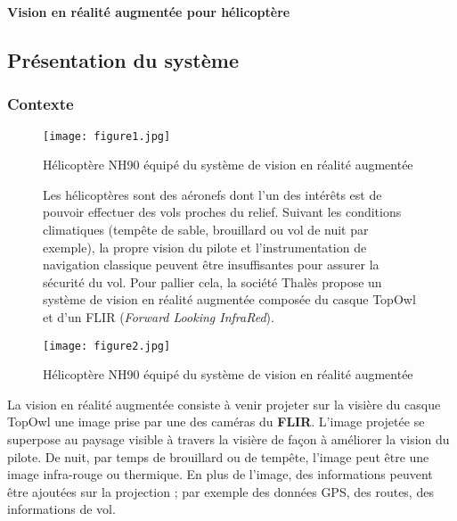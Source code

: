 \begin{huge}
\textbf{Vision en réalité augmentée pour hélicoptère}
\end{huge}

\subsection{Présentation du système}

\subsubsection{Contexte}
\begin{figure}[h]
\begin{center}
\texttt{[image: figure1.jpg]}
\caption{Hélicoptère NH90 équipé du système de vision en réalité augmentée\label{fig1}}
\end{center}
\end{figure}

\begin{figure}[!htb]
\begin{center}
\begin{minipage}{0.45\textwidth}
Les hélicoptères sont des aéronefs dont l'un des intérêts
est de pouvoir effectuer des vols proches du relief. Suivant
les conditions climatiques (tempête de sable, brouillard
ou vol de nuit par exemple), la propre vision du pilote
et l'instrumentation de navigation classique peuvent être
insuffisantes pour assurer la sécurité du vol. Pour pallier
cela, la société Thalès propose un système de vision en
réalité augmentée composée du casque TopOwl et d'un
FLIR (\textit{Forward Looking InfraRed}).
\end{minipage}
\begin{minipage}{0.45\textwidth}
\begin{center}
\texttt{[image: figure2.jpg]}
\caption{Hélicoptère NH90 équipé du système de vision en réalité augmentée\label{fig2}}
\end{center}
\end{minipage}
\end{center}
\end{figure}

La vision en réalité augmentée consiste à venir projeter
sur la visière du casque TopOwl une image prise par une
des caméras du \textbf{FLIR}. L'image projetée se superpose au
paysage visible à travers la visière de façon à améliorer
la vision du pilote. De nuit, par temps de brouillard ou
de tempête, l'image peut être une image infra-rouge ou
thermique. En plus de l'image, des informations peuvent être ajoutées sur la projection ; par exemple des données
GPS, des routes, des informations de vol.

